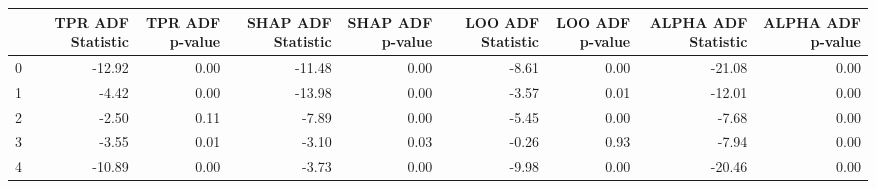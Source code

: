\begin{tabular}{lrrrrrrrr}
\toprule
 & TPR ADF Statistic & TPR ADF p-value & SHAP ADF Statistic & SHAP ADF p-value & LOO ADF Statistic & LOO ADF p-value & ALPHA ADF Statistic & ALPHA ADF p-value \\
\midrule
0 & -12.92 & 0.00 & -11.48 & 0.00 & -8.61 & 0.00 & -21.08 & 0.00 \\
1 & -4.42 & 0.00 & -13.98 & 0.00 & -3.57 & 0.01 & -12.01 & 0.00 \\
2 & -2.50 & 0.11 & -7.89 & 0.00 & -5.45 & 0.00 & -7.68 & 0.00 \\
3 & -3.55 & 0.01 & -3.10 & 0.03 & -0.26 & 0.93 & -7.94 & 0.00 \\
4 & -10.89 & 0.00 & -3.73 & 0.00 & -9.98 & 0.00 & -20.46 & 0.00 \\
\bottomrule
\end{tabular}
